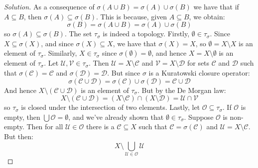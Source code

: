 \documentclass{article}
\theoremstyle{normal}
\begin{document}
    \color{black}
    \begin{proof}[Solution]
        As a consequence of $\sigma(A\cup{B})=\sigma(A)\cup\sigma(B)$ we have
        that if $A\subseteq{B}$, then $\sigma(A)\subseteq\sigma(B)$. This is
        because, given $A\subseteq{B}$, we obtain:
        \begin{equation}
            \sigma(B)=\sigma(A\cup{B})=\sigma(A)\cup\sigma(B)
        \end{equation}
        so $\sigma(A)\subseteq\sigma(B)$. The set $\tau_{\sigma}$ is indeed a
        topology. Firstly, $\emptyset\in\tau_{\sigma}$.
        Since $X\subseteq\sigma(X)$, and since $\sigma(X)\subseteq{X}$, we have
        that $\sigma(X)=X$, so $\emptyset=X\setminus{X}$ is an element of
        $\tau_{\sigma}$. Similarly, $X\in\tau_{\sigma}$ since
        $\sigma(\emptyset)=\emptyset$, and hence $X=X\setminus\emptyset$ is an
        element of $\tau_{\sigma}$. Let $\mathcal{U},\mathcal{V}\in\tau_{\sigma}$.
        Then $\mathcal{U}=X\setminus\mathcal{C}$ and
        $\mathcal{V}=X\setminus\mathcal{D}$ for sets $\mathcal{C}$ and
        $\mathcal{D}$ such that $\sigma(\mathcal{C})=\mathcal{C}$ and
        $\sigma(\mathcal{D})=\mathcal{D}$. But since $\sigma$ is a Kuratowski
        closure operator:
        \begin{equation}
            \sigma(\mathcal{C}\cup\mathcal{D})
            =\sigma(\mathcal{C})\cup\sigma(\mathcal{D})
            =\mathcal{C}\cup\mathcal{D}
        \end{equation}
        And hence $X\setminus(\mathcal{C}\cup\mathcal{D})$ is an element of
        $\tau_{\sigma}$. But by the De Morgan law:
        \begin{equation}
            X\setminus(\mathcal{C}\cup\mathcal{D})
            =(X\setminus\mathcal{C})\cap(X\setminus\mathcal{D})
            =\mathcal{U}\cap\mathcal{V}
        \end{equation}
        so $\tau_{\sigma}$ is closed under the intersection of two elements.
        Lastly, let $\mathcal{O}\subseteq\tau_{\sigma}$. If $\mathcal{O}$ is
        empty, then $\bigcup\mathcal{O}=\emptyset$, and we've already shown that
        $\emptyset\in\tau_{\sigma}$. Suppose $\mathcal{O}$ is non-empty. Then
        for all $\mathcal{U}\in\mathcal{O}$ there is a
        $\mathcal{C}\subseteq{X}$ such that $\mathcal{C}=\sigma(\mathcal{C})$
        and $\mathcal{U}=X\setminus\mathcal{C}$. But then:
        \begin{equation}
            X\setminus\bigcup_{\mathcal{U}\in\mathcal{O}}\mathcal{U}

\end{equation}
\end{proof}
\end{document}
